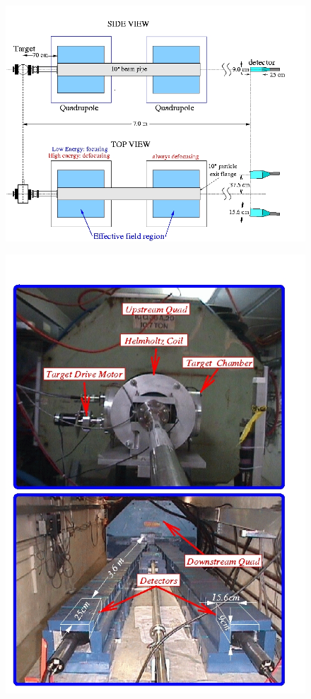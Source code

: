             \begin{figure}[H]
    			\centering
    			\includegraphics[width=12cm]{Chapters/Ch2-Experiment/clas-12-system/pics/other/hall-b-poll-1.jpg}
    			\caption{ }
			\end{figure}
			
												
			 \begin{figure}[H]
    			\centering
    			\includegraphics[width=12cm]{Chapters/Ch2-Experiment/clas-12-system/pics/other/hall-b-poll-2.jpg}
    			\caption{ }
			\end{figure}
			
